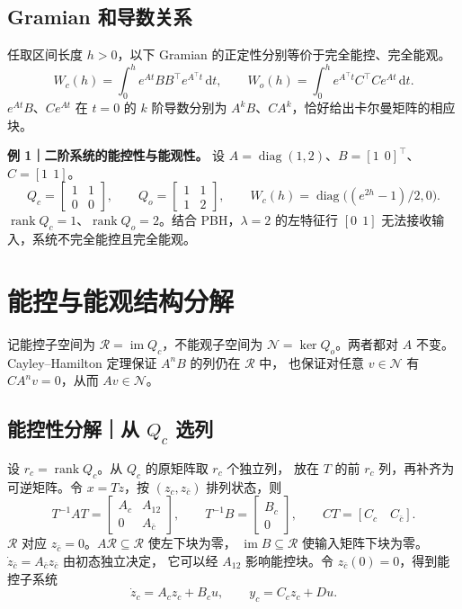 \documentclass[UTF8,a4paper,12pt,fontset=fandol]{ctexart}
\DeclareMathOperator{\rank}{rank}
\DeclareMathOperator{\im}{im}
\newcommand{\dd}{\,\mathrm{d}}
\begin{document}
\subsection*{Gramian 和导数关系}
任取区间长度 $h>0$，以下 Gramian 的正定性分别等价于完全能控、完全能观。
\[
  W_c(h)=\int_0^h e^{At}BB^\top e^{A^\top t}\dd t,\qquad
  W_o(h)=\int_0^h e^{A^\top t}C^\top C e^{At}\dd t.
\]
$e^{At}B$、$Ce^{At}$ 在 $t=0$ 的 $k$ 阶导数分别为 $A^kB$、$CA^k$，恰好给出卡尔曼矩阵的相应块。

\textbf{例 1｜二阶系统的能控性与能观性。}
设 $A=\operatorname{diag}(1,2)$、$B=[1\ \ 0]^\top$、$C=[1\ \ 1]$。
\[
 Q_c=\begin{bmatrix}1&1\\0&0\end{bmatrix},\qquad
 Q_o=\begin{bmatrix}1&1\\1&2\end{bmatrix},\qquad
 W_c(h)=\operatorname{diag}\bigl((e^{2h}-1)/2,0\bigr).
\]
$\rank Q_c=1$、$\rank Q_o=2$。结合 PBH，$\lambda=2$ 的左特征行 $[0\ \ 1]$ 无法接收输入，系统不完全能控且完全能观。
\newpage
\section{能控与能观结构分解}\label{sec:decomp}

记能控子空间为 $\mathcal R=\im Q_c$，不能观子空间为
$\mathcal N=\ker Q_o$。两者都对 $A$ 不变。
Cayley--Hamilton 定理保证 $A^nB$ 的列仍在 $\mathcal R$ 中，
也保证对任意 $v\in\mathcal N$ 有 $CA^nv=0$，从而 $Av\in\mathcal N$。

\subsection*{能控性分解｜从 $Q_c$ 选列}
设 $r_c=\rank Q_c$。从 $Q_c$ 的原矩阵取 $r_c$ 个独立列，
放在 $T$ 的前 $r_c$ 列，再补齐为可逆矩阵。令
$x=Tz$，按 $(z_c,z_{\bar c})$ 排列状态，则
\[
  T^{-1}AT=\begin{bmatrix}A_c&A_{12}\\0&A_{\bar c}\end{bmatrix},
  \qquad T^{-1}B=\begin{bmatrix}B_c\\0\end{bmatrix},
  \qquad CT=[C_c\quad C_{\bar c}].
\]
$\mathcal R$ 对应 $z_{\bar c}=0$。$A\mathcal R\subseteq\mathcal R$ 使左下块为零，
$\im B\subseteq\mathcal R$ 使输入矩阵下块为零。
$\dot z_{\bar c}=A_{\bar c}z_{\bar c}$ 由初态独立决定，
它可以经 $A_{12}$ 影响能控块。令 $z_{\bar c}(0)=0$，得到能控子系统
\[
  \dot z_c=A_c z_c+B_cu,\qquad y_c=C_cz_c+Du .
\]
\end{document}
